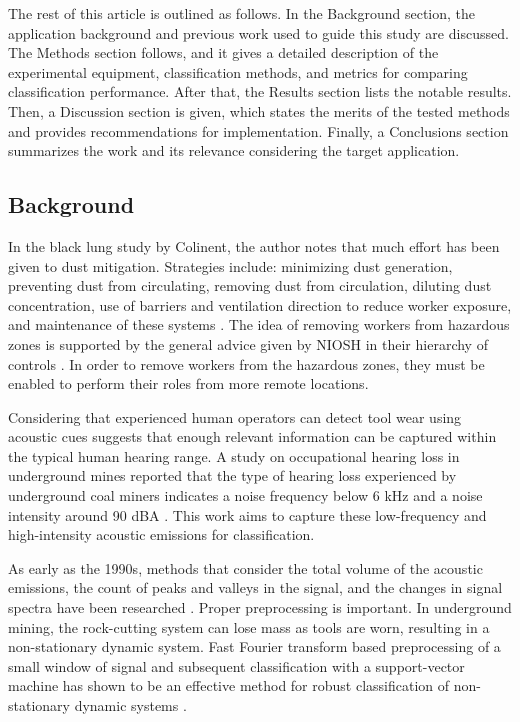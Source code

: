 The rest of this article is outlined as follows.  In the Background section, the application background 
and previous work used to guide this study are discussed. The Methods section follows, and it gives a 
detailed description of the experimental equipment, classification methods, and metrics for comparing 
classification performance. After that, the Results section lists the notable results. Then, a Discussion 
section is given, which states the merits of the tested methods and provides recommendations for 
implementation. Finally, a Conclusions section summarizes the work and its relevance considering the target application.

\subsection{Background}\label{sec1a}

In the black lung study by Colinent, the author notes that much effort has been given to dust mitigation.
Strategies include: minimizing dust generation, preventing dust from circulating, removing
dust from circulation, diluting dust concentration, use of barriers and ventilation direction
to reduce worker exposure, and maintenance of these systems \cite{Colinent2020}. 
The idea of removing workers from hazardous zones is supported 
 by the general advice given by NIOSH in their hierarchy of controls \cite{niosh_2015}.
In order to remove workers from the hazardous zones, they must be enabled to perform their roles from 
more remote locations. 

Considering that experienced human operators can detect tool wear using acoustic cues
suggests that enough relevant information can be captured within the typical human hearing range.
A study on occupational hearing loss in underground mines reported that the type of hearing loss experienced 
by underground coal miners indicates a noise frequency below 6 kHz and a noise intensity 
around 90 dBA \cite{Erol2022}. 
This work aims to capture these low-frequency and high-intensity acoustic emissions for classification.

As early as the 1990s, methods that consider the total volume of the acoustic emissions, 
the count of peaks and valleys in the signal, and the changes in signal spectra 
have been researched \cite{Tan1992,Kakade1995}.
Proper preprocessing is important. 
In underground mining, the rock-cutting system can lose mass as tools are worn,
resulting in a non-stationary dynamic system.
Fast Fourier transform based preprocessing of a small window of signal
 and subsequent classification with a support-vector machine has shown 
 to be an effective method for robust classification of non-stationary dynamic systems \cite{xu2016fftsvm}.

